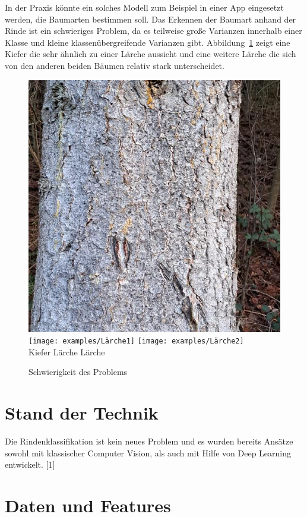 \documentclass{article}
\begin{document}
In der Praxis könnte ein solches Modell zum Beispiel in einer App eingesetzt werden, die Baumarten bestimmen soll. Das Erkennen der Baumart anhand der Rinde ist ein schwieriges Problem, da es teilweise gro\ss e Varianzen innerhalb einer Klasse und kleine klassenübergreifende Varianzen gibt. Abbildung~\ref{problem} zeigt eine Kiefer die sehr ähnlich zu einer Lärche aussieht und eine weitere Lärche die sich von den anderen beiden Bäumen relativ stark unterscheidet.

\begin{figure}[htbp!]
  \centering
  \includegraphics[width=0.32\linewidth]{examples/Kiefer}
  \texttt{[image: examples/Lärche1]}
  \texttt{[image: examples/Lärche2]}\\
  Kiefer \hspace{100px} Lärche \hspace{100px} Lärche
  \caption{Schwierigkeit des Problems}
  \label{problem}
\end{figure}

\section{Stand der Technik}
Die Rindenklassifikation ist kein neues Problem und es wurden bereits Ansätze sowohl mit klassischer Computer Vision, als auch mit Hilfe von Deep Learning entwickelt. [1]

\section{Daten und Features}
\end{document}
